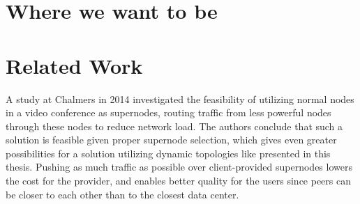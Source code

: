 \section{Where we want to be}



\section{Related Work}


A study at Chalmers in 2014\cite{tree-topology-webrtc} investigated the feasibility of utilizing normal nodes in a video conference as supernodes, routing traffic from less powerful nodes through these nodes to reduce network load. The authors conclude that such a solution is feasible given proper supernode selection, which gives even greater possibilities for a solution utilizing dynamic topologies like presented in this thesis. Pushing as much traffic as possible over client-provided supernodes lowers the cost for the provider, and enables better quality for the users since peers can be closer to each other than to the closest data center.
